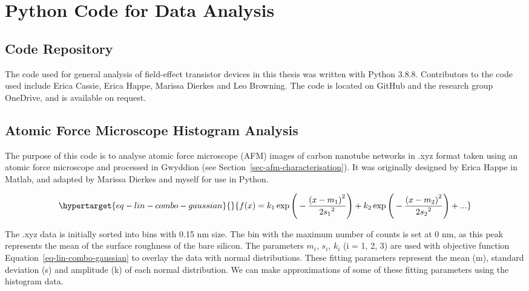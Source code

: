 \documentclass[
  a4paper,
]{scrbook}
\begin{document}
\hypertarget{sec-python}{%
\chapter{Python Code for Data Analysis}\label{sec-python}}

\hypertarget{code-repository}{%
\section{Code Repository}\label{code-repository}}

The code used for general analysis of field-effect transistor devices in
this thesis was written with Python 3.8.8. Contributors to the code used
include Erica Cassie, Erica Happe, Marissa Dierkes and Leo Browning. The
code is located on GitHub and the research group OneDrive, and is
available on request.

\hypertarget{sec-histogram-analysis}{%
\section{Atomic Force Microscope Histogram
Analysis}\label{sec-histogram-analysis}}

The purpose of this code is to analyse atomic force microscope (AFM)
images of carbon nanotube networks in .xyz format taken using an atomic
force microscope and processed in Gwyddion (see
Section~\ref{sec-afm-characterisation}). It was originally designed by
Erica Happe in Matlab, and adapted by Marissa Dierkes and myself for use
in Python.

\begin{equation}\protect\hypertarget{eq-lin-combo-gaussian}{}{
f(x) = k_1\exp{\Bigg(-\frac{{(x-m_1)}^{2}}{{2s_1}^{2}}\Bigg)} + k_2\exp{\Bigg(-\frac{{(x-m_2)}^{2}}{{2s_2}^{2}}\Bigg)} + ...
}\label{eq-lin-combo-gaussian}\end{equation}

The .xyz data is initially sorted into bins with 0.15 nm size. The bin
with the maximum number of counts is set at 0 nm, as this peak
represents the mean of the surface roughness of the bare silicon. The
parameters \(m_i\), \(s_i\), \(k_i\) (i = 1, 2, 3) are used with
objective function Equation~\ref{eq-lin-combo-gaussian} to overlay the
data with normal distributions. These fitting parameters represent the
mean (m), standard deviation (s) and amplitude (k) of each normal
distribution. We can make approximations of some of these fitting
parameters using the histogram data.
\end{document}
